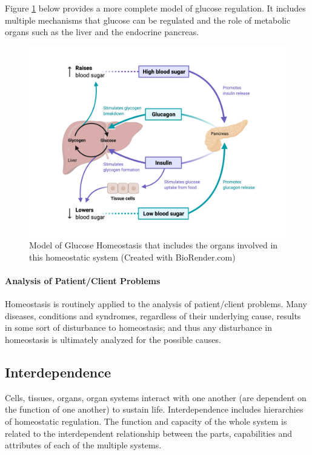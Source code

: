 Figure \ref{fig:complete_glucose_homeo} below provides a more complete model of glucose regulation. It includes multiple mechanisms that glucose can be regulated and the role of metabolic organs such as the liver and the endocrine pancreas.

\begin{figure}[!ht]
    \centering
    \includegraphics[width=1\linewidth]{./figure/complete_glucose_homeo.png}
    \caption{Model of Glucose Homeostasis that includes the organs involved in this homeostatic system \footnotesize{(Created with BioRender.com)}}
    \label{fig:complete_glucose_homeo}
\end{figure}

\paragraph{Analysis of Patient/Client Problems}
Homeostasis is routinely applied to the analysis of patient/client problems. Many diseases, conditions and syndromes, regardless of their underlying cause, results in some sort of disturbance to homeostasis; and thus any disturbance in homeostasis is ultimately analyzed for the possible causes.

\subsection{Interdependence}
Cells, tissues, organs, organ systems interact with one another (are dependent on the function of one another) to sustain life. Interdependence includes hierarchies of homeostatic regulation. The function and capacity of the whole system is related to the interdependent relationship between the parts, capabilities and attributes of each of the multiple systems. 

